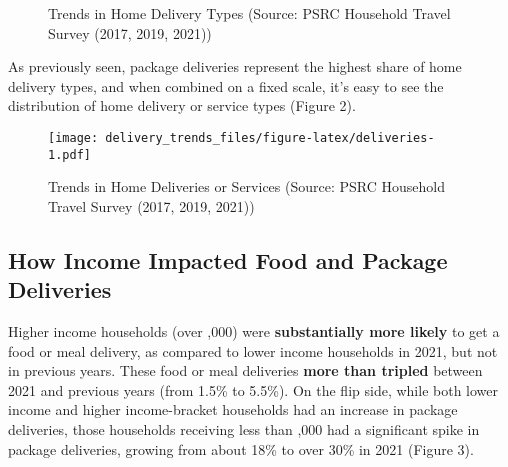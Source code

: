 \documentclass[
  11pt,
]{article}
\begin{document}
\begin{figure}[H]
\newline{}\caption{Trends in Home Delivery Types (Source: PSRC Household Travel Survey (2017, 2019, 2021))}\label{fig:individual delivery type}
\end{figure}

\newpage
\setlength{\headheight}{10pt}
\setlength{\textheight}{665pt}
\fancyhead[L]{}

\begin{flushleft} 
As previously seen, package deliveries represent the highest share of home delivery types, and when combined on a fixed scale, it's easy to see the distribution of home delivery or service types (Figure 2). 
\end{flushleft}

\begin{figure}
\centering
\texttt{[image: delivery\_trends\_files/figure-latex/deliveries-1.pdf]}
\caption{Trends in Home Deliveries or Services (Source: PSRC Household
Travel Survey (2017, 2019, 2021))}
\end{figure}

\hypertarget{how-income-impacted-food-and-package-deliveries}{%
\subsection{How Income Impacted Food and Package
Deliveries}\label{how-income-impacted-food-and-package-deliveries}}

\begin{flushleft}
Higher income households (over ,000) were \textbf{substantially more likely} to get a food or meal delivery, as compared to lower income households in 2021, but not in previous years. These food or meal deliveries \textbf{more than tripled} between 2021 and previous years (from 1.5\% to 5.5\%). On the flip side, while both lower income and higher income-bracket households had an increase in package deliveries, those households receiving less than ,000 had a significant spike in package deliveries, growing from about 18\% to over 30\% in 2021 (Figure 3).
\end{flushleft}
\end{document}
